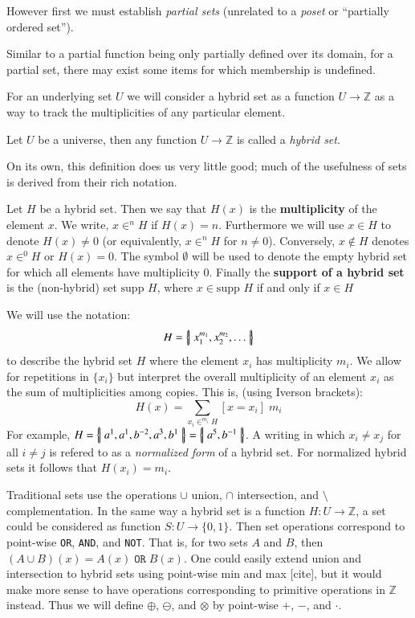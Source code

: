 However first we must establish \emph{partial sets} (unrelated to a \emph{poset} or ``partially ordered set'').

Similar to a partial function being only partially defined over its domain, 
for a partial set, there may exist some items for which membership is undefined.


For an underlying set $U$ we will consider a hybrid set as a function $U \to \mathbb{Z}$ as a way to track the multiplicities of any particular element.

\begin{definition}
	Let $U$ be a universe, then any function $U \to \mathbb{Z}$ is called a \emph{hybrid set}.
\end{definition}

On its own, this definition does us very little good; much of the usefulness of sets is derived from their rich notation.

\begin{definition}
	Let $H$ be a hybrid set. 
	Then we say that $H(x)$ is the \textbf{multiplicity} of the element $x$. 
	We write, $x \in^n H$ if $H(x)=n$. 
	Furthermore we will use $x \in H$ to denote $H(x)\neq 0$ (or equivalently, $x \in^n H$ for $n\neq 0$).
	Conversely, $x \notin H$ denotes $x \in^0 H$ or $H(x)=0$.
	The symbol $\emptyset$ will be used to denote the empty hybrid set for which all elements have multiplicity 0.
	Finally the \textbf{support of a hybrid set} is the (non-hybrid) set $\text{supp }H$,
	where $x \in \text{supp }H$ if and only if $x \in H$
\end{definition}


We will use the notation:
\begin{equation*}
	H = \left\{ \! \left| \; x_1^{m_1}, x_2^{m_2},\ldots \; \right| \! \right\}
\end{equation*}
to describe the hybrid set $H$ where the element $x_i$ has multiplicity $m_i$. 
We allow for repetitions in $\{ x_i \}$ but interpret the overall multiplicity of an element $x_i$ as 
the sum of multiplicities among copies. This is, (using Iverson brackets):
\begin{equation}
	H(x) = \sum_{x_i \in^{m_i} H} [x = x_i] \; m_i
\end{equation}
For example, $H=\left\{ \! \left| \; a^1, a^1, b^{-2}, a^3, b^1 \; \right| \! \right\} = \left\{ \! \left| \; a^5, b^{-1} \; \right| \! \right\}$. 
A writing in which $x_i \neq x_j$ for all $i \neq j$ is refered to as a \emph{normalized form} of a hybrid set. 
For normalized hybrid sets it follows that $H(x_i) = m_i$.



Traditional sets use the operations $\cup$ union, $\cap$ intersection, and $\setminus$ complementation.
In the same way a hybrid set is a function $H : U \to \mathbb{Z}$, 
a set could be considered as function $S : U \to \{ 0,1 \}$.
Then set operations correspond to point-wise \texttt{OR}, \texttt{AND}, and \texttt{NOT}.
That is, for two sets $A$ and $B$, then $(A \cup B)(x) = A(x) \;\mathtt{OR}\; B(x)$.
One could easily extend union and intersection to hybrid sets using point-wise min and max
[cite],
but it would make more sense to have operations corresponding to primitive operations in $\mathbb{Z}$ instead.
Thus we will define $\oplus$, $\ominus$, and $\otimes$ by point-wise $+$, $-$, and $\cdot$.

